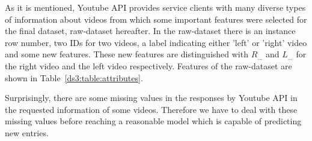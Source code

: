 As it is mentioned, Youtube API provides service clients with many diverse types
of information about videos from which some important features were selected for
the final dataset, raw-dataset hereafter. In the raw-dataset there is an instance
row number, two IDs for two videos, a label indicating either 'left' or 'right'
video and some new features. These new features are distinguished with 
$R_{\ldots}$ and $L_{\ldots}$ for the right video and the left video
respectively.
Features of the raw-dataset are shown in Table~\ref{ds3:table:attributes}.

Surprisingly, there are some missing values in the responses by Youtube API in
the requested information of some videos. Therefore we have to deal with these
missing values before reaching a reasonable model which is capable of predicting
new entries.



